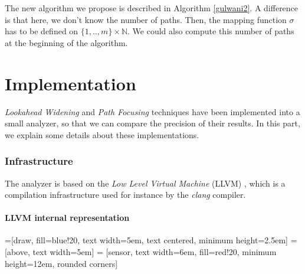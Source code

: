 \documentclass[a4paper,english,titlepage,11pt]{article}
\def\N{\mathbb{N}}
\begin{document}
The new algorithm we propose is described in Algorithm \ref{gulwani2}.
A difference is that here, we don't know the number of paths. Then, the mapping
function $\sigma$ has to be defined on $\{1,..,m\} \times \N$. We could also
compute this number of paths at the beginning of the algorithm.

\FloatBarrier
\part{Implementation}\label{implementationpart}

\emph{Lookahead Widening} and \emph{Path Focusing}
techniques have been implemented into a small analyzer, so that we can compare
the precision of their results. In this part, we explain some details about
these implementations.

 \section{Infrastructure}
The analyzer is based on the \emph{Low Level Virtual Machine} (LLVM)
\cite{LLVM:CGO04}, which is a compilation infrastructure used for instance by
the \emph{clang} compiler.

\subsection{LLVM internal representation}

=[draw, fill=blue!20, text width=5em, 
    text centered, minimum height=2.5em]
 = [above, text width=5em]
 = [sensor, text width=6em, fill=red!20, 
    minimum height=12em, rounded corners]
\def\leftdist{2.3}
\def\rightdist{5.0}
\def\edgedist{2.5}
\end{document}
